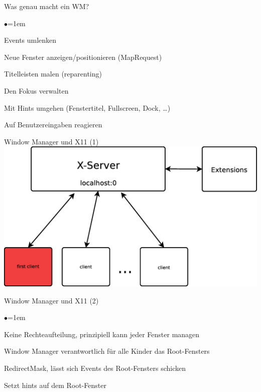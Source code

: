 \documentclass[mode=print,paper=screen,style=jefka]{powerdot}
\begin{document}
\begin{slide}{Was genau macht ein WM?}
\begin{list}{$\bullet$}{\itemsep=1em}
	\item<1-> Events umlenken
	\item<2-> Neue Fenster anzeigen/positionieren (MapRequest)
	\item<3-> Titelleisten malen (reparenting)
	\item<4-> Den Fokus verwalten
	\item<5-> Mit Hints umgehen (Fenstertitel, Fullscreen, Dock, …)
	\item<6-> Auf Benutzereingaben reagieren
\end{list}
\end{slide}


\begin{slide}[method=direct]{Window Manager und X11 (1)}
\includegraphics[width=1\textwidth]{xserver_konzept.eps}
\end{slide}

\begin{slide}{Window Manager und X11 (2)}
\begin{list}{$\bullet$}{\itemsep=1em}
	\item<1-> Keine Rechteaufteilung, prinzipiell kann jeder Fenster managen
	\item<2-> Window Manager verantwortlich für alle Kinder das Root-Fensters
	\item<3-> RedirectMask, lässt sich Events des Root-Fensters schicken
	\item<4-> Setzt hints auf dem Root-Fenster
\end{list}
\end{slide}
\end{document}
